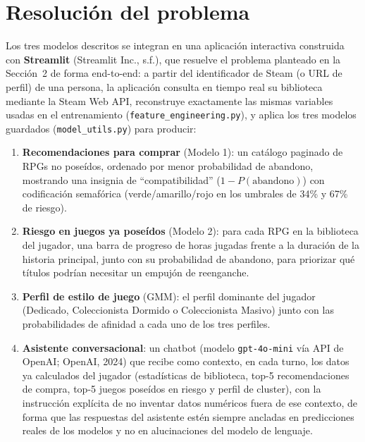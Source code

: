 \documentclass[11pt,letterpaper]{article}
\newcommand{\code}[1]{\texttt{\small #1}}
\begin{document}
\section{Resolución del problema}

Los tres modelos descritos se integran en una aplicación interactiva construida con \textbf{Streamlit} (Streamlit Inc., s.f.), que resuelve el problema planteado en la Sección~2 de forma end-to-end: a partir del identificador de Steam (o URL de perfil) de una persona, la aplicación consulta en tiempo real su biblioteca mediante la Steam Web API, reconstruye exactamente las mismas variables usadas en el entrenamiento (\code{feature\_engineering.py}), y aplica los tres modelos guardados (\code{model\_utils.py}) para producir:

\begin{enumerate}
  \item \textbf{Recomendaciones para comprar} (Modelo 1): un catálogo paginado de RPGs no poseídos, ordenado por menor probabilidad de abandono, mostrando una insignia de ``compatibilidad'' ($1 - P(\text{abandono})$) con codificación semafórica (verde/amarillo/rojo en los umbrales de 34\% y 67\% de riesgo).
  \item \textbf{Riesgo en juegos ya poseídos} (Modelo 2): para cada RPG en la biblioteca del jugador, una barra de progreso de horas jugadas frente a la duración de la historia principal, junto con su probabilidad de abandono, para priorizar qué títulos podrían necesitar un empujón de reenganche.
  \item \textbf{Perfil de estilo de juego} (GMM): el perfil dominante del jugador (Dedicado, Coleccionista Dormido o Coleccionista Masivo) junto con las probabilidades de afinidad a cada uno de los tres perfiles.
  \item \textbf{Asistente conversacional}: un chatbot (modelo \code{gpt-4o-mini} vía API de OpenAI; OpenAI, 2024) que recibe como contexto, en cada turno, los datos ya calculados del jugador (estadísticas de biblioteca, top-5 recomendaciones de compra, top-5 juegos poseídos en riesgo y perfil de cluster), con la instrucción explícita de no inventar datos numéricos fuera de ese contexto, de forma que las respuestas del asistente estén siempre ancladas en predicciones reales de los modelos y no en alucinaciones del modelo de lenguaje.
\end{enumerate}
\end{document}

